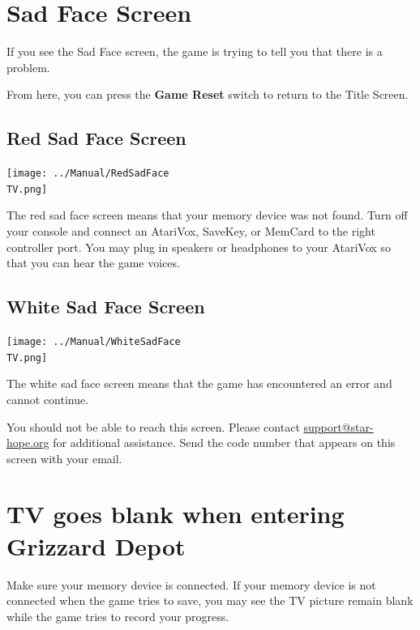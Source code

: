 \documentclass[10pt,twocolumn,openany,article]{memoir}
\newcommand\TV{NTSC}
\newcommand\TV{PAL}
\newcommand\TV{SECAM}
\begin{document}
\begin{description}
\fi

\section{Sad Face Screen}

If you  see the Sad  Face screen,  the game is  trying to tell  you that
there is a problem.

From here, you can press the \textbf{Game Reset} switch to return to the
Title Screen.

\ifdefined\NOSAVE\else

\subsection{Red Sad Face Screen}

\texttt{[image: ../Manual/RedSadFace\\TV.png]}

The red  sad face screen  means that your  memory device was  not found.
Turn off  your console and connect  an AtariVox, SaveKey, or  MemCard to
the right  controller port. You  may plug  in speakers or  headphones to
your AtariVox so that you can hear the game voices.

\fi

\subsection{White Sad Face Screen}

\texttt{[image: ../Manual/WhiteSadFace\\TV.png]}

The white sad  face screen means that the game  has encountered an error
and cannot continue. 

You  should   not  be  able   to  reach  this  screen.   Please  contact
\href{mailto:support@star-hope.org}{support@star-hope.org}           for
additional assistance. Send the code  number that appears on this screen
with your email.

\ifdefined\NOSAVE\else

\section{TV goes blank when entering Grizzard Depot}

Make sure your memory device is  connected. If your memory device is not
connected when the game tries to save, you may see the TV picture remain
blank while the game tries to record your progress.


\end{description}
\end{document}
